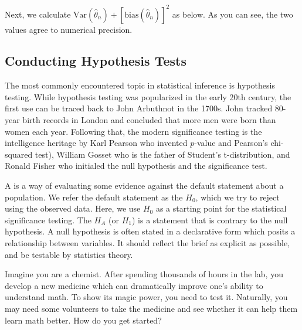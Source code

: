 \documentclass[letterpaper,11pt,english]{sphinxmanual}
\begin{document}
Next, we calculate
\(\mathrm{Var} (\hat{\theta}_n) + [\mathrm{bias} (\hat{\theta}_n)]^2\)
as below. As you can see, the two values agree to numerical precision.

\begin{sphinxVerbatim}[commandchars=\\\{\}]
   
  
\end{sphinxVerbatim}


\subsection{Conducting Hypothesis Tests}
\label{\detokenize{chapter_appendix_math/statistics:conducting-hypothesis-tests}}
The most commonly encountered topic in statistical inference is
hypothesis testing. While hypothesis testing was popularized in the
early 20th century, the first use can be traced back to John Arbuthnot
in the 1700s. John tracked 80-year birth records in London and concluded
that more men were born than women each year. Following that, the modern
significance testing is the intelligence heritage by Karl Pearson who
invented \(p\)-value and Pearson’s chi-squared test), William Gosset
who is the father of Student’s t-distribution, and Ronald Fisher who
initialed the null hypothesis and the significance test.

A  is a way of evaluating some evidence against the
default statement about a population. We refer the default statement as
the  \(H_0\), which we try to reject using the
observed data. Here, we use \(H_0\) as a starting point for the
statistical significance testing. The 
\(H_A\) (or \(H_1\)) is a statement that is contrary to the null
hypothesis. A null hypothesis is often stated in a declarative form
which posits a relationship between variables. It should reflect the
brief as explicit as possible, and be testable by statistics theory.

Imagine you are a chemist. After spending thousands of hours in the lab,
you develop a new medicine which can dramatically improve one’s ability
to understand math. To show its magic power, you need to test it.
Naturally, you may need some volunteers to take the medicine and see
whether it can help them learn math better. How do you get started?
\end{document}
